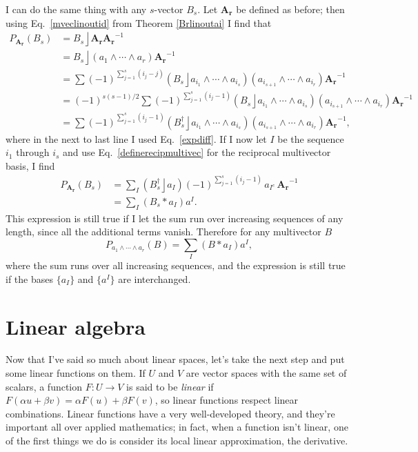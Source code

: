 \documentclass{utarticle}
\newcommand{\bl}[1]{\ensuremath{\bm{#1}}}
\DeclareMathOperator{\lin}{\rfloor}
\DeclareMathOperator{\out}{\wedge}
\newcommand{\rev}[1]{\ensuremath{#1^\dagger}}
\newcommand{\scprod}[2]{\ensuremath{#1 * #2}}
\begin{document}
I can do the same thing with any $s$-vector $B_s$.  Let \bl{A_r} be defined as before;
then using Eq.~\eqref{mveclinoutid} from Theorem \ref{Brlinoutai} I find that
\begin{align}
P_{\bl{A_r}}(B_s) & = B_s \lin \bl{A_r} \bl{A_r}^{-1} \nonumber \\
                                & = B_s \lin (a_1 \out \dotsb \out a_r) \bl{A_r}^{-1} \nonumber \\
                                & = \sum (-1)^{\sum_{j=1}^s (i_j-j)} (B_s \lin a_{i_1} \out \dotsb \out a_{i_s}) (a_{i_{s+1}} \out \dotsb \out a_{i_r}) \bl{A_r}^{-1} \nonumber \\
                                & = (-1)^{s(s-1)/2} \sum (-1)^{\sum_{j=1}^s (i_j-1)} (B_s \lin a_{i_1} \out \dotsb \out a_{i_s}) (a_{i_{s+1}} \out \dotsb \out a_{i_r}) \bl{A_r}^{-1} \nonumber \\
                                & = \sum (-1)^{\sum_{j=1}^s (i_j-1)} (\rev{B_s} \lin a_{i_1} \out \dotsb \out a_{i_s}) (a_{i_{s+1}} \out \dotsb \out a_{i_r}) \bl{A_r}^{-1},
\end{align}
where in the next to last line I used Eq.~\eqref{expdiff}.  If I now let $I$ be the sequence $i_1$ through
$i_s$ and use Eq.~\eqref{definerecipmultivec} for the reciprocal multivector basis, I find
\begin{align}
P_{\bl{A_r}}(B_s) & = \sum_I  (\rev{B_s} \lin a_I) (-1)^{\sum_{j=1}^s (i_j-1)}\, a_{I^c} \, \bl{A_r}^{-1} \nonumber \\
                                & = \sum_I (\scprod{B_s}{a_I}) a^I.
\end{align}
This expression is still true if I let the sum run over increasing sequences of any length, since all
the additional terms vanish.  Therefore for any multivector $B$
\begin{equation}
P_{a_1 \out \dotsb \out a_r}(B) = \sum_I (\scprod{B}{a_I}) a^I,
\label{projmultivecsubspace}
\end{equation}
where the sum runs over all increasing sequences, and the expression is still true 
if the bases $\{a_I\}$ and $\{a^I\}$ are interchanged.

\section{Linear algebra}
\label{linalg}

Now that I've said so much about linear spaces, let's take the next step and 
put some linear functions on them.  If $U$ and $V$ are vector spaces with 
the same set of scalars, a function $F: U \rightarrow V$ is said to be \emph{linear} if
$F(\alpha u + \beta v) = \alpha F(u) + \beta F(v)$, so linear functions respect linear combinations.
Linear functions have a very well-developed theory, and they're important all over 
applied mathematics; in fact, when a function isn't linear, one of the first things 
we do is consider its local linear approximation, the derivative.
\end{document}
